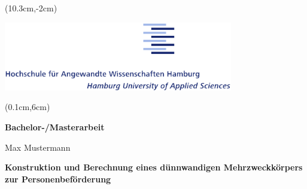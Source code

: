 {
\begin{titlepage}
  



\setlength{\parindent}{-2.5cm} %

\begin{textblock*}{\textwidth}(10.3cm,-2cm)
  \begin{minipage}[r]{\textwidth}
    \includegraphics[width=10cm]{figures/HAW_logo.eps}%
   \end{minipage}
\end{textblock*}

\begin{textblock*}{\paperwidth}(0.1cm,6cm)
  \colorbox{HAWBannerColor}{
    \begin{minipage}[l][9,6cm][c]{\paperwidth}%
       \hspace*{0.25\textwidth}
       \parbox[t]{0.635\textwidth}{
        {\begin{flushright}
       
          \vspace{1cm}
        {\bfseries\huge Bachelor-/Masterarbeit}

        \vspace{2cm}
         \Large Max Mustermann

        \vspace{0.5cm}
         {\bfseries\LARGE Konstruktion und Berechnung eines dünnwandigen Mehrzweckkörpers zur Personenbeförderung}
        \end{flushright}
        }}%
   \end{minipage}
    }
  \end{textblock*}


\end{titlepage}}
